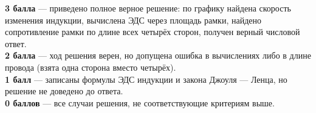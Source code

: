 \documentclass[12pt,a4paper]{article}
\begin{document}
\begin{critbox}
\textbf{3 балла} — приведено полное верное решение: по графику найдена скорость изменения индукции,
вычислена ЭДС через площадь рамки, найдено сопротивление рамки по длине всех четырёх сторон, получен
верный числовой ответ.\\[0.3em]
\textbf{2 балла} — ход решения верен, но допущена ошибка в вычислениях либо в длине провода (взята
одна сторона вместо четырёх).\\[0.3em]
\textbf{1 балл} — записаны формулы ЭДС индукции и закона Джоуля — Ленца, но решение не доведено до
ответа.\\[0.3em]
\textbf{0 баллов} — все случаи решения, не соответствующие критериям выше.
\end{critbox}
\end{document}
